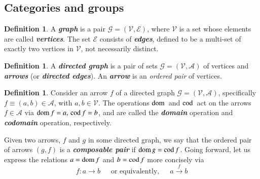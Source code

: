 \documentclass[12pt]{article}
\numberwithin{equation}{section}
\theoremstyle{definition}
\newtheorem{defn}[thm]{Definition}
\newcommand{		\dom		}	{	{\text{\rm dom\,}}		}
\newcommand{		\cod		}	{	{\text{\rm cod\,}}		}
\newcommand{		\B		}	{\textbf					} %
\newcommand{		\1		}	{	\bm{1}					}%
\begin{document}





\subsection{Categories and groups } 



\begin{defn} A \emph{\B{graph}} is a pair $\mathcal{G} = (\mathcal{V}, \mathcal{E})$, where $\mathcal{V}$ is a set whose elements are called \emph{\B{vertices}}. The set $\mathcal{E}$ consists of \emph{\B{edges}}, defined to be a multi-set of exactly two vertices in $\mathcal{V}$, not necessarily distinct. 


\end{defn}

\begin{defn} 
A \emph{\B{directed graph}} is a pair of sets  $\mathcal{G} = (\mathcal{V}, \mathcal{A})$ of vertices and \B{\emph{arrows}} (or \B{\emph{directed edges}}). An \emph{\B{arrow}} is an \emph{ordered pair} of vertices.
\end{defn}

\begin{defn}  Consider an arrow $f$ of a directed graph $\mathcal{G} = ( \mathcal{V}, \mathcal{A})$, specifically $f \equiv (a,b) \in \mathcal{A}$, with $a,b \in \mathcal{V}$. The operations $\dom$ and $\cod$ act on the arrows $f \in \mathcal{A}$ via $\dom f = a,\, \cod f = b$, and are called the \emph{\B{domain}} operation and \emph{\B{codomain}} operation,  respectively. 
\end{defn}

Given two arrows, $f$ and $g$ in some directed graph, we say that the ordered pair of arrows $(g,f)$ is a \emph{\B{composable pair}} if $\dom g = \cod f$. Going forward, let us express the relations $a = \dom f$ and $b = \cod f$ more concisely via
$$
f : a \to b \, \quad \text { or equivalently, } \, \quad a \xrightarrow[\,]{ f} b  
$$
\end{document}

